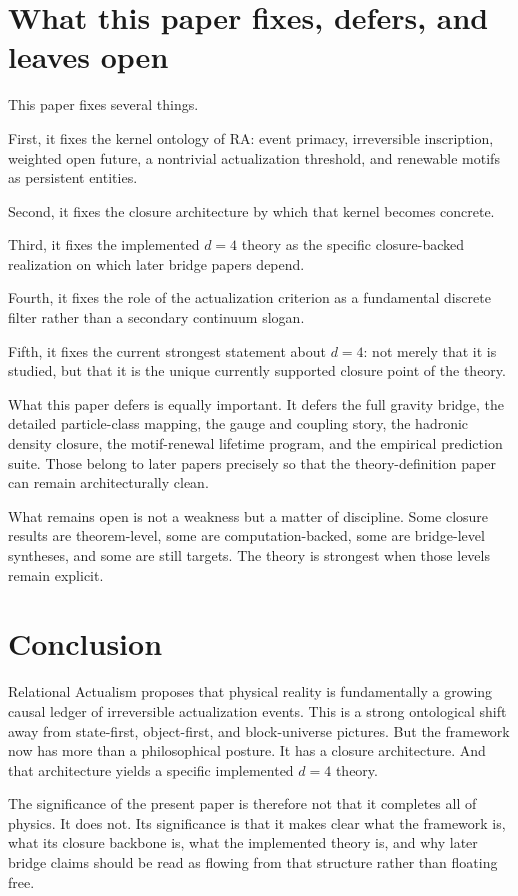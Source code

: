 \documentclass[11pt]{article}
\begin{document}
\section{What this paper fixes, defers, and leaves open}\label{sec:scope}
This paper fixes several things.

First, it fixes the kernel ontology of RA: event primacy, irreversible inscription, weighted open future, a nontrivial actualization threshold, and renewable motifs as persistent entities.

Second, it fixes the closure architecture by which that kernel becomes concrete.

Third, it fixes the implemented $d=4$ theory as the specific closure-backed realization on which later bridge papers depend.

Fourth, it fixes the role of the actualization criterion as a fundamental discrete filter rather than a secondary continuum slogan.

Fifth, it fixes the current strongest statement about $d=4$: not merely that it is studied, but that it is the unique currently supported closure point of the theory.

What this paper defers is equally important. It defers the full gravity bridge, the detailed particle-class mapping, the gauge and coupling story, the hadronic density closure, the motif-renewal lifetime program, and the empirical prediction suite. Those belong to later papers precisely so that the theory-definition paper can remain architecturally clean.

What remains open is not a weakness but a matter of discipline. Some closure results are theorem-level, some are computation-backed, some are bridge-level syntheses, and some are still targets. The theory is strongest when those levels remain explicit.

\section{Conclusion}\label{sec:conclusion}
Relational Actualism proposes that physical reality is fundamentally a growing causal ledger of irreversible actualization events. This is a strong ontological shift away from state-first, object-first, and block-universe pictures. But the framework now has more than a philosophical posture. It has a closure architecture. And that architecture yields a specific implemented $d=4$ theory.

The significance of the present paper is therefore not that it completes all of physics. It does not. Its significance is that it makes clear what the framework is, what its closure backbone is, what the implemented theory is, and why later bridge claims should be read as flowing from that structure rather than floating free.
\end{document}
